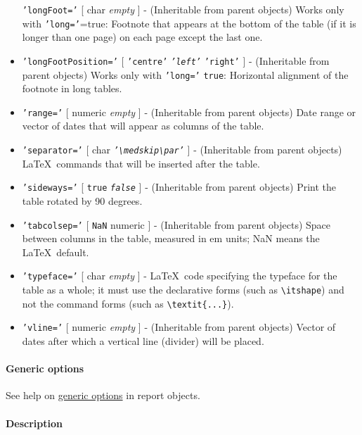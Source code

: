 \begin{itemize}
  \texttt{'longFoot='} {[} char \textbar{} \emph{empty} {]} -
  (Inheritable from parent objects) Works only with
  \texttt{'long='}=true: Footnote that appears at the bottom of the
  table (if it is longer than one page) on each page except the last
  one.
\item
  \texttt{'longFootPosition='} {[} \texttt{'centre'} \textbar{}
  \emph{\texttt{'left'}} \textbar{} \texttt{'right'} {]} - (Inheritable
  from parent objects) Works only with \texttt{'long='} \texttt{true}:
  Horizontal alignment of the footnote in long tables.
\item
  \texttt{'range='} {[} numeric \textbar{} \emph{empty} {]} -
  (Inheritable from parent objects) Date range or vector of dates that
  will appear as columns of the table.
\item
  \texttt{'separator='} {[} char \textbar{}
  \emph{\texttt{'\textbackslash{}medskip\textbackslash{}par'}} {]} -
  (Inheritable from parent objects) \LaTeX~commands that will be
  inserted after the table.
\item
  \texttt{'sideways='} {[} \texttt{true} \textbar{}
  \emph{\texttt{false}} {]} - (Inheritable from parent objects) Print
  the table rotated by 90 degrees.
\item
  \texttt{'tabcolsep='} {[} \texttt{NaN} \textbar{} numeric {]} -
  (Inheritable from parent objects) Space between columns in the table,
  measured in em units; NaN means the \LaTeX~default.
\item
  \texttt{'typeface='} {[} char \textbar{} \emph{empty} {]} -
  \LaTeX~code specifying the typeface for the table as a whole; it must
  use the declarative forms (such as \texttt{\textbackslash{}itshape})
  and not the command forms (such as
  \texttt{\textbackslash{}textit\{...\}}).
\item
  \texttt{'vline='} {[} numeric \textbar{} \emph{empty} {]} -
  (Inheritable from parent objects) Vector of dates after which a
  vertical line (divider) will be placed.
\end{itemize}

\paragraph{Generic options}

See help on \href{report/Contents}{generic options} in report objects.

\paragraph{Description}


